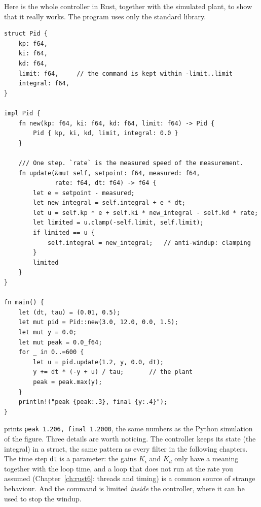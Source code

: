 Here is the whole controller in Rust, together with the simulated plant, to show that it really works. The program uses only the standard library.
\begin{verbatim}
struct Pid {
    kp: f64,
    ki: f64,
    kd: f64,
    limit: f64,     // the command is kept within -limit..limit
    integral: f64,
}

impl Pid {
    fn new(kp: f64, ki: f64, kd: f64, limit: f64) -> Pid {
        Pid { kp, ki, kd, limit, integral: 0.0 }
    }

    /// One step. `rate` is the measured speed of the measurement.
    fn update(&mut self, setpoint: f64, measured: f64,
              rate: f64, dt: f64) -> f64 {
        let e = setpoint - measured;
        let new_integral = self.integral + e * dt;
        let u = self.kp * e + self.ki * new_integral - self.kd * rate;
        let limited = u.clamp(-self.limit, self.limit);
        if limited == u {
            self.integral = new_integral;   // anti-windup: clamping
        }
        limited
    }
}

fn main() {
    let (dt, tau) = (0.01, 0.5);
    let mut pid = Pid::new(3.0, 12.0, 0.0, 1.5);
    let mut y = 0.0;
    let mut peak = 0.0_f64;
    for _ in 0..=600 {
        let u = pid.update(1.2, y, 0.0, dt);
        y += dt * (-y + u) / tau;       // the plant
        peak = peak.max(y);
    }
    println!("peak {peak:.3}, final {y:.4}");
}
\end{verbatim}
prints \verb!peak 1.206, final 1.2000!, the same numbers as the Python simulation of the figure. Three details are worth noticing. The controller keeps its state (the integral) in a struct, the same pattern as every filter in the following chapters. The time step \verb!dt! is a parameter: the gains $K_i$ and $K_d$ only have a meaning together with the loop time, and a loop that does not run at the rate you assumed (Chapter~\ref{ch:rust6}: threads and timing) is a common source of strange behaviour. And the command is limited \emph{inside} the controller, where it can be used to stop the windup.

